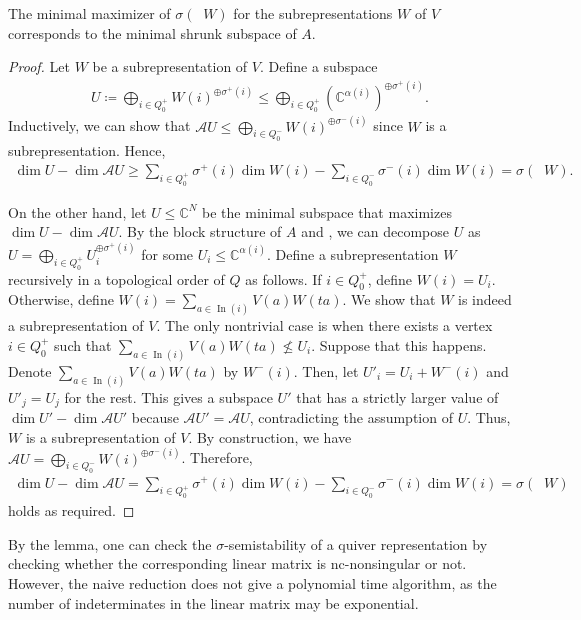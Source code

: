 \documentclass[a4paper,11pt]{article}
\numberwithin{equation}{section}
\newcommand{\C}{\mathbb{C}}
\newcommand{\caA}{\mathcal{A}}
\DeclareMathOperator{\In}{In}
\DeclareMathOperator{\dimv}{\underline{dim}}
\begin{document}
\begin{lemma}\label{lem:shrunk-King}
    The minimal maximizer of $\sigma(\dimv W)$ for the subrepresentations $W$ of $V$ corresponds to the minimal shrunk subspace of $A$.
\end{lemma}
\begin{proof}
    Let $W$ be a subrepresentation of $V$. 
    Define a subspace 
    \begin{align}
        U \coloneqq \bigoplus_{i \in Q_0^+} W(i)^{\oplus \sigma^+(i)} \leq \bigoplus_{i \in Q_0^+} (\C^{\alpha(i)})^{\oplus \sigma^+(i)}.
    \end{align}
    Inductively, we can show that $\caA U \leq \bigoplus_{i \in Q_0^-} W(i)^{\oplus\sigma^-(i)}$ since $W$ is a subrepresentation.
    Hence, 
    \begin{align}
        \dim U - \dim \caA U \geq \sum_{i \in Q_0^+} \sigma^+(i)\dim W(i) - \sum_{i \in Q_0^-} \sigma^-(i)\dim W(i) = \sigma(\dimv W).
    \end{align}

    On the other hand, let $U \leq \C^N$ be the minimal subspace that maximizes $\dim U - \dim \caA U$.
    By the block structure of $A$ and , we can decompose $U$ as $U = \bigoplus_{i \in Q_0^+} U_i^{\oplus\sigma^+(i)}$ for some $U_i \leq \C^{\alpha(i)}$.
    Define a subrepresentation $W$ recursively in a topological order of $Q$ as follows.
    If $i \in Q_0^+$, define $W(i) = U_i$. Otherwise, define $W(i) = \sum_{a \in \In(i)} V(a)W(ta)$.
    We show that $W$ is indeed a subrepresentation of $V$. 
    The only nontrivial case is when there exists a vertex $i \in Q_0^+$ such that $\sum_{a \in \In(i)} V(a) W(ta) \not\leq U_i$.
    Suppose that this happens.
    Denote $\sum_{a \in \In(i)} V(a) W(ta)$ by $W^-(i)$.
    Then, let $U'_i = U_i + W^-(i)$ and $U'_j = U_j$ for the rest.
    This gives a subspace $U'$ that has a strictly larger value of $\dim U' - \dim \caA U'$ because $\caA U' = \caA U$, contradicting the assumption of $U$.
    Thus, $W$ is a subrepresentation of $V$.
    By construction, we have $\caA U = \bigoplus_{i \in Q_0^-} W(i)^{\oplus\sigma^-(i)}$.
    Therefore, 
    \begin{align}
        \dim U - \dim \caA U = \sum_{i \in Q_0^+} \sigma^+(i)\dim W(i) - \sum_{i \in Q_0^-} \sigma^-(i)\dim W(i) = \sigma(\dimv W)
    \end{align}
    holds as required.
\end{proof}

By the lemma, one can check the $\sigma$-semistability of a quiver representation by checking whether the corresponding linear matrix is nc-nonsingular or not.
However, the naive reduction does not give a polynomial time algorithm, as the number of indeterminates in the linear matrix may be exponential.
\end{document}
